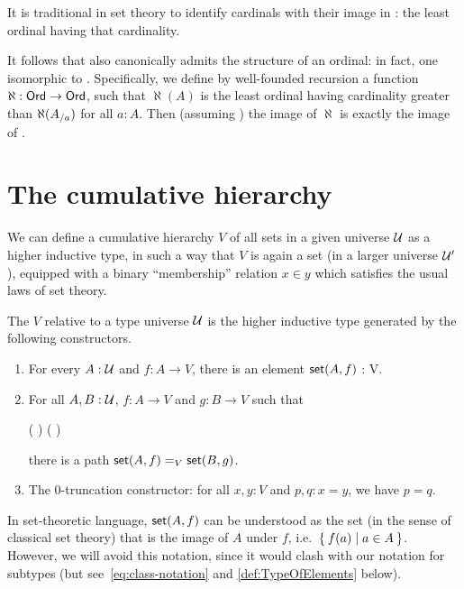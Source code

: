 It is traditional in set theory to identify cardinals with their image in \ord: the least ordinal having that cardinality.

It follows that \card also canonically admits the structure of an ordinal: in fact, one isomorphic to \ord.
Specifically, we define by well-founded recursion a function $\aleph:\ord\to\ord$, such that $\aleph(A)$ is the least ordinal having cardinality greater than $\aleph({\ordsl A a})$ for all $a:A$.
Then (assuming \choice{}) the image of $\aleph$ is exactly the image of \card.

%

%

\section{The cumulative hierarchy}
\label{sec:cumulative-hierarchy}

%
We can define a cumulative hierarchy $V$ of all sets in a given universe $\UU$ as a higher inductive type, in such a way that $V$ is again a set (in a larger universe $\UU'$), equipped with a binary ``membership'' relation $x\in y$ which satisfies the usual laws of set theory.

\begin{defn}\label{defn:V}
  The 
  $V$ relative to a type universe $\UU$ is the
  higher inductive type generated by the following constructors.
  \begin{enumerate}
  \item For every $A : \UU$ and $f : A \to V$, there is an element $\vset(A, f)$ : V.
  \item For all $A, B : \UU$, $f : A \to V$ and $g : B \to V$ such that
    \begin{narrowmultline} \label{eq:V-path}
      \big(  \big) \land \narrowbreak
      \big(  \big)
    \end{narrowmultline}
    there is a path $\id[V]{\vset(A,f)}{\vset(B,g)}$.
  \item The 0-truncation constructor: for all $x,y:V$ and $p,q:x=y$, we have $p=q$.
  \end{enumerate}
\end{defn}

In set-theoretic language, $\vset(A,f)$ can be understood as the set (in the sense of classical set theory) that is the image of $A$ under $f$, i.e.\ $\setof{ f(a) | a \in A }$.
However, we will avoid this notation, since it would clash with our notation for subtypes (but see~\eqref{eq:class-notation} and \autoref{def:TypeOfElements} below).

